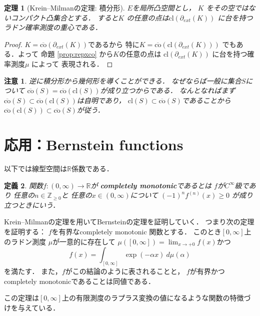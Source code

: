 \documentclass[leqno, a4paper, 12pt]{jsarticle}
\newtheorem{thm}{定理}
\newtheorem{df}[thm]{定義}
\newtheorem*{rmk}{注意}
\newcommand{\zz}{\mathbb{Z}}
\newcommand{\rr}{\mathbb{R}}
\newcommand{\cl}{\mathrm{cl}}
\newcommand{\myextreme}[1]{\partial_{ext}(#1)}
\newcommand{\mycco}[1]{\overline{\mathrm{co}}(#1)}
\begin{document}
\begin{thm}[Krein--Milmanの定理: 積分形]\label{thm:main2}
$E$を局所凸空間とし，
$K$
をその空ではないコンパクト凸集合とする．
すると$K$
の任意の点は$\cl(\myextreme{K})$
に台を持つラドン確率測度の重心である．
\end{thm}
\begin{proof}
$K=\mycco{\myextreme{K}}$であるから
特に$K=\mycco{\cl(\myextreme{K})}$
でもある．よって
命題
\ref{prop:repxco}
から$K$の任意の点は
$\cl(\myextreme{K})$
に台を持つ確率測度$\mu$
によって
表現される．
\end{proof}
\begin{rmk}
逆に積分形から幾何形を導くことができる．
なぜならば一般に集合$S$について
$\mycco{S}=\mycco{\cl(S)}$が成り立つからである．
なんとなればまず$\mycco{S}\subset \mycco{\cl(S)}$は自明であり，
$\cl(S)\subset \mycco{S}$であることから
$\mycco{\cl(S)}\subset \mycco{S}$が従う．
\end{rmk}



\section{応用：Bernstein functions}
以下では線型空間は$\rr$係数である．
\begin{df}
関数$f\colon (0, \infty)\to \rr$が
\textbf{completely monotonic}であるとは
$f$が$C^{\infty}$級であり
任意の$n\in \zz_{\ge 0}$と
任意の$x\in (0, \infty)$について
$(-1)^{n}f^{(n)}(x)\ge 0$
が成り立つときにいう．
\end{df}

Krein--Milmanの定理を用いてBernsteinの定理を証明していく．
つまり次の定理を証明する：
$f$を有界なcompletely monotonic 関数とする．
このとき$[0, \infty]$上のラドン測度
$\mu$が一意的に存在して
$\mu([0, \infty])=\lim_{x\to +0}f(x)$かつ
\[
f(x)=\int_{[0, \infty]}\exp(-\alpha x)\ d\mu(\alpha)
\]
を満たす．
また，$f$がこの結論のように表されることと，
$f$が有界かつcompletely monotonicであることは同値である．

この定理は$[0, \infty]$上の有限測度のラプラス変換の値になるような関数の特徴づけを与えている．
\end{document}
